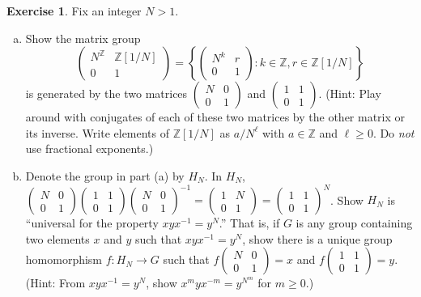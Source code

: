 \documentclass[10pt]{article}
\newcommand{\ZZ}{\mathbb Z}
\theoremstyle{Theorem}
\theoremstyle{definition}
\newtheorem{exe}{Exercise}
\theoremstyle{remark}
\theoremstyle{custom}
\begin{document}
\begin{exe} 
Fix an integer $N > 1$.
\begin{enumerate}[(a)]
 

\item  Show the matrix group 
$$
\left(\begin{array}{cc}
N^\ZZ & \ZZ[1/N] \\ 0 & 1 
\end{array}
\right) 
= 
\left\{\left(
\begin{array}{cc}
N^k & r \\0 & 1 
\end{array}
\right) : k \in \ZZ, r \in \ZZ[1/N]\right\} 
$$
is generated by the two matrices 
$(\begin{smallmatrix}N&0\\0&1\end{smallmatrix})$ and 
$(\begin{smallmatrix}1&1\\0&1\end{smallmatrix})$.
(Hint:  Play around with conjugates of each of these two matrices by the other matrix or its inverse. Write elements of 
$\ZZ[1/N]$ as $a/N^\ell$ with $a \in \ZZ$ and $\ell \geq 0$. Do {\it not} use fractional exponents.) 


\item  Denote the group in part (a) by $H_N$.  In $H_N$, $(\begin{smallmatrix}N&0\\0&1\end{smallmatrix})(\begin{smallmatrix}1&1\\0&1\end{smallmatrix})(\begin{smallmatrix}N&0\\0&1\end{smallmatrix})^{-1} = (\begin{smallmatrix}1&N\\0&1\end{smallmatrix}) = 
(\begin{smallmatrix}1&1\\0&1\end{smallmatrix})^N$.  Show $H_N$ is ``universal for the property $xyx^{-1} = y^N$.'' 
That is, if $G$ is any group containing two elements $x$ and $y$ such that $xyx^{-1} = y^N$, 
show there is a unique group homomorphism $f \colon H_N \rightarrow G$ such that 
$f(\begin{smallmatrix}N&0\\0&1\end{smallmatrix}) = x$ and 
$f(\begin{smallmatrix}1&1\\0&1\end{smallmatrix}) = y$.  
(Hint: From $xyx^{-1} = y^N$, show $x^myx^{-m} = y^{N^m}$ for $m \geq 0$.) 
\end{enumerate}
\end{exe} 
\end{document}
